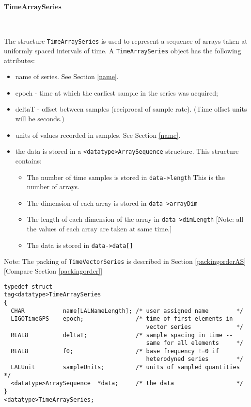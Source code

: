 \documentclass[]{ligodcc}
\renewcommand{\texttt}[1]{{\ttfamily\color{blue}#1}}
\begin{document}
\paragraph{{\texttt {TimeArraySeries}} }~


The structure {\tt TimeArraySeries} is used to represent a sequence of
arrays taken at uniformly spaced intervals of time. A {\tt TimeArraySeries}
object has the following attributes:

\begin{itemize}
\vspace{-0.15in}
\item
name of series. See Section \ref{name}.
\vspace{-0.15in}
\item
epoch  -  time at which the earliest sample in the series was acquired;
\vspace{-0.15in}
\item
deltaT  - offset between samples (reciprocal of sample rate).  (Time
offset units will be seconds.)
\vspace{-0.15in}
\item
units of values recorded in samples. See Section \ref{name}.
\vspace{-0.15in}
\item
the data is stored in a {\tt <datatype>ArraySequence}  structure. This
structure contains:
\begin{itemize}
\vspace{-0.10in}
\item
The number of time samples is stored in {\tt data->length} This is the
number of arrays.
\vspace{-0.10in}
\item
The dimension of each array is stored in {\tt data->arrayDim}
\vspace{-0.10in}
\item
The length of each dimension of the array in {\tt data->dimLength}
[Note:  all the values of each array are taken at same time.]
\vspace{-0.10in}
\item
The data is stored in {\tt data->data[]}
\end{itemize}
\end{itemize}

Note: The packing of {\tt TimeVectorSeries} is described in Section
\ref{packingorderAS} [Compare Section \ref{packingorder}] 

{\footnotesize
\begin{verbatim}
typedef struct
tag<datatype>TimeArraySeries
{
  CHAR           name[LALNameLength]; /* user assigned name        */
  LIGOTimeGPS    epoch;               /* time of first elements in
                                         vector series             */
  REAL8          deltaT;              /* sample spacing in time -- 
                                         same for all elements     */
  REAL8          f0;                  /* base frequency !=0 if 
                                         heterodyned series        */
  LALUnit        sampleUnits;         /* units of sampled quantities */
  <datatype>ArraySequence  *data;     /* the data                  */
}
<datatype>TimeArraySeries;
\end{verbatim}}
\end{document}
